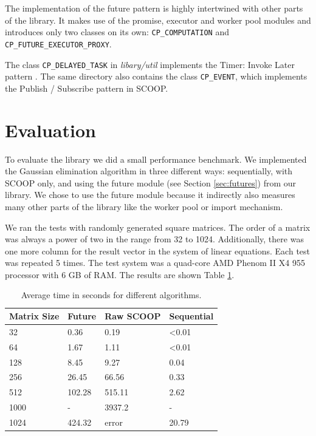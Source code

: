 \documentclass[a4paper,10pt,titlepage]{article}
\newcommand{\dir}{\emph}
\begin{document}
The implementation of the future pattern is highly intertwined with other parts of the library.
It makes use of the promise, executor and worker pool modules and introduces only two classes on its own:
\lstinline!CP_COMPUTATION! and \lstinline!CP_FUTURE_EXECUTOR_PROXY!.

The class \lstinline!CP_DELAYED_TASK! in \dir{libary/util} implements the Timer: Invoke Later pattern .
The same directory also contains the class \lstinline!CP_EVENT!, which implements the Publish / Subscribe pattern  in SCOOP.



\section{Evaluation}
\label {sec:evaluation}

To evaluate the library we did a small performance benchmark.
We implemented the Gaussian elimination algorithm in three different ways: sequentially, with SCOOP only, and using the future module (see Section \ref{sec:futures}) from our library.
We chose to use the future module because it indirectly also measures many other parts of the library like the worker pool or import mechanism.

We ran the tests with randomly generated square matrices.
The order of a matrix was always a power of two in the range from 32 to 1024.
Additionally, there was one more column for the result vector in the system of linear equations.
Each test was repeated 5 times.
The test system was a quad-core AMD Phenom II X4 955 processor with 6 GB of RAM.
The results are shown Table \ref{table:perf-results}.

\begin{table} [h]
\centering
\begin{tabular}{|l|l l l|} 
\hline
Matrix Size & Future & Raw SCOOP & Sequential\\
\hline
32 & 0.36 & 0.19 &  \textless 0.01\\
64 & 1.67 & 1.11 & \textless 0.01\\
128 & 8.45 & 9.27 & 0.04\\
256 & 26.45 & 66.56 & 0.33\\
512 & 102.28 & 515.11 & 2.62\\
1000 & - &  3937.2 & - \\
1024 & 424.32 & error & 20.79 \\
\hline
\end{tabular}
\caption{Average time in seconds for different algorithms.}
\label{table:perf-results}
\end{table}
\end{document}
